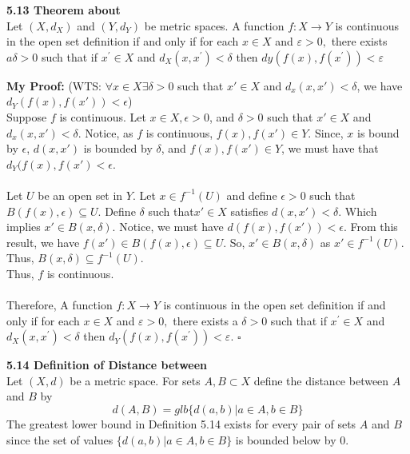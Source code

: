 \documentclass[12pt]{article}
\newenvironment{proofed}[1][]{\par \medskip \noindent \textbf{#1 Proof: }}{\hfill$\square$}
\newenvironment{defn}[2][]{\par \medskip \noindent \textbf{#1 Definition of \large#2 \medskip \\}}{\rmfamily \medskip}
\newenvironment{thm}[2][]{\par \medskip \noindent \textbf{#1 Theorem about \large#2 \medskip \\}}{\rmfamily \medskip}
\begin{document}
	\begin{thm}[5.13]{}
		 Let $\left( X , d _ { X } \right)$ and $\left( Y , d _ { Y } \right)$ be metric spaces. A function
		$f : X \rightarrow Y$ is continuous in the open set definition if and only if for each $x \in X$ and $\varepsilon > 0 ,$ there exists $a \delta > 0$ such that if $x ^ { \prime } \in X$ and $d _ { X } \left( x , x ^ { \prime } \right) < \delta$
		then $d y \left( f ( x ) , f \left( x ^ { \prime } \right) \right) < \varepsilon$
		\begin{proofed}[My]
				(WTS: $\forall x\in X \exists \delta >0$ such that $ x'\in X $ and $ d_x(x,x')< \delta$, we have $ d_Y(f(x),f(x'))<\epsilon $)\\
			Suppose $ f $ is continuous. Let $ x\in X , \epsilon >0 $, and $ \delta > 0 $ such that $ x' \in X $ and $ d_x(x,x') < \delta $. Notice, as $ f $ is continuous, $ f(x), f(x')\in Y $. Since, $ x $ is bound by $\epsilon$, $ d(x,x') $ is bounded by $ \delta $, and $ f(x),f(x')\in Y $, we must have that $ d_Y(f(x),f(x') < \epsilon $.\\
			\\
			Let $ U $ be an open set in $ Y $. Let $ x\in f^{-1}(U) $ and define $ \epsilon > 0 $ such that $B(f(x),\epsilon)\subseteq U $. Define $ \delta $ such that$ x'\in X$ satisfies $ d(x,x')<\delta $. Which implies $ x'\in B(x,\delta) $. Notice, we must have $ d(f(x),f(x'))<\epsilon $. From this result, we have $ f(x')\in B(f(x),\epsilon)\subseteq U $. So, $ x'\in B(x,\delta) $ as $ x'\in f^{-1}(U) $.\\
			Thus, $ B(x,\delta) \subseteq f^{-1}(U) $.\\
			Thus, $ f $ is continuous.\\
			\\
			Therefore, A function
			$f : X \rightarrow Y$ is continuous in the open set definition if and only if for each $x \in X$ and $\varepsilon > 0 ,$ there exists a $\delta > 0$ such that if $x ^ { \prime } \in X$ and $d_X \left( x , x ^ { \prime } \right) < \delta$
			then $d _ { Y } \left( f ( x ) , f \left( x ^ { \prime } \right) \right) < \varepsilon .$
		\end{proofed}
	\end{thm}
	\begin{defn}[5.14]{Distance between}
		Let $( X , d )$ be a metric space. For sets $A , B \subset X$ define the distance between $A$ and $B$ by
			\[d ( A , B ) = g l b \{ d ( a , b ) | a \in A , b \in B \}\]
		The greatest lower bound in Definition 5.14 exists for every pair of sets $A$
		and $B$ since the set of values $\{ d ( a , b ) | a \in A , b \in B \}$ is bounded below by $0 .$
	\end{defn}
\end{document}
